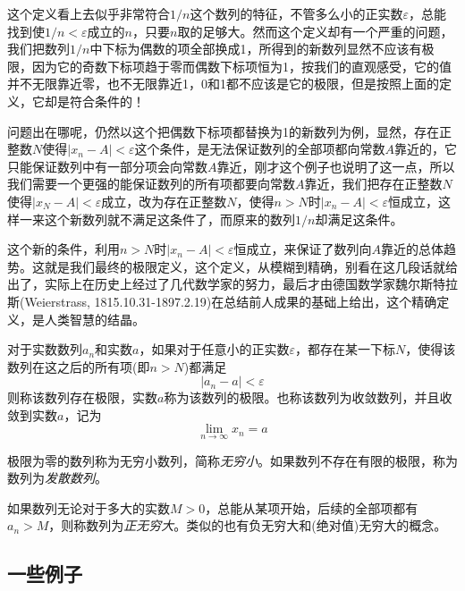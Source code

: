 这个定义看上去似乎非常符合$1/n$这个数列的特征，不管多么小的正实数$\varepsilon$，总能找到使$1/n < \varepsilon$成立的$n$，只要$n$取的足够大。然而这个定义却有一个严重的问题，我们把数列$1/n$中下标为偶数的项全部换成1，所得到的新数列显然不应该有极限，因为它的奇数下标项趋于零而偶数下标项恒为1，按我们的直观感受，它的值并不无限靠近零，也不无限靠近1，0和1都不应该是它的极限，但是按照上面的定义，它却是符合条件的！

问题出在哪呢，仍然以这个把偶数下标项都替换为1的新数列为例，显然，存在正整数$N$使得$|x_n-A|<\varepsilon$这个条件，是无法保证数列的全部项都向常数$A$靠近的，它只能保证数列中有一部分项会向常数$A$靠近，刚才这个例子也说明了这一点，所以我们需要一个更强的能保证数列的所有项都要向常数$A$靠近，我们把存在正整数$N$使得$|x_N-A|<\varepsilon$成立，改为存在正整数$N$，使得$n>N$时$|x_n-A|<\varepsilon$恒成立，这样一来这个新数列就不满足这条件了，而原来的数列$1/n$却满足这条件。

这个新的条件，利用$n>N$时$|x_n-A|<\varepsilon$恒成立，来保证了数列向$A$靠近的总体趋势。这就是我们最终的极限定义，这个定义，从模糊到精确，别看在这几段话就给出了，实际上在历史上经过了几代数学家的努力，最后才由德国数学家魏尔斯特拉斯(Weierstrass, 1815.10.31-1897.2.19)在总结前人成果的基础上给出，这个精确定义，是人类智慧的结晶。

\begin{definition}
  对于实数数列${a_n}$和实数$a$，如果对于任意小的正实数$\varepsilon$，都存在某一下标$N$，使得该数列在这之后的所有项(即$n>N$)都满足
  \begin{equation}
    \label{eq:the-definition-of-sequence-limit}
    |a_n-a|<\varepsilon
  \end{equation}
  则称该数列存在极限，实数$a$称为该数列的极限。也称该数列为收敛数列，并且收敛到实数$a$，记为
  \begin{equation}
    \label{eq:limit-definition-for-number-sequence}
    \lim_{n \to \infty}x_n = a
  \end{equation}
\end{definition}

极限为零的数列称为无穷小数列，简称\emph{无穷小}。如果数列不存在有限的极限，称为数列为\emph{发散数列}。

如果数列无论对于多大的实数$M>0$，总能从某项开始，后续的全部项都有$a_n>M$，则称数列为\emph{正无穷大}。类似的也有负无穷大和(绝对值)无穷大的概念。

\subsection{一些例子}
\label{sec:some-example-for-number-sequence}

